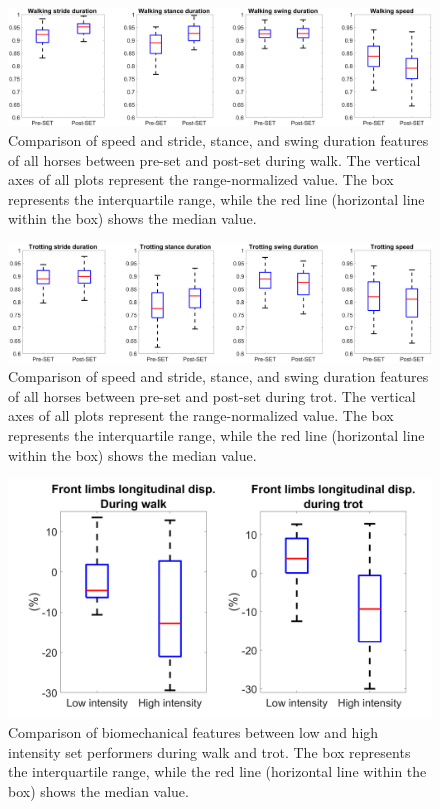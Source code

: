 \begin{figure}[htbp]
\centering
\includegraphics[width=.95\linewidth]{chapters/prepost/figures/walk_HQ.png}
\caption{Comparison of speed and stride, stance, and swing duration features of all horses between pre-\gls{set} and post-\gls{set} during walk. The vertical axes of all plots represent the range-normalized value. The box represents the interquartile range, while the red line (horizontal line within the box) shows the median value.}
\label{walk}
\end{figure}

\begin{figure}[htbp]
\centering
\includegraphics[width=.95\linewidth]{chapters/prepost/figures/trot_HQ.png}
\caption{Comparison of speed and stride, stance, and swing duration features of all horses between pre-\gls{set} and post-\gls{set} during trot. The vertical axes of all plots represent the range-normalized value. The box represents the interquartile range, while the red line (horizontal line within the box) shows the median value.}
\label{trot}
\end{figure}

\begin{figure}[!htbp]
\centering
\includegraphics[scale=0.06]{chapters/prepost/figures/long_pp_HQ.png}
\caption{Comparison of biomechanical features between low and high intensity \gls{set} performers during walk and trot. The box represents the interquartile range, while the red line (horizontal line within the box) shows the median value.}
\label{prepostlong}
\end{figure}

